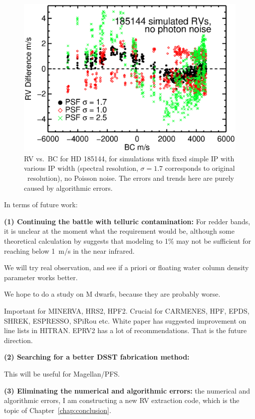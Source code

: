 \begin{figure}
\includegraphics[scale=0.65]{telluric/185144-rv-bc-rja01-rje01-rjf01.eps} 
\caption{RV vs.\ BC for HD 185144, for simulations with fixed simple
IP with various IP width (spectral resolution, $\sigma=1.7$
corresponds to original \keck\ resolution), no Poisson noise. The
errors and trends here are purely caused by algorithmic errors.
\label{telluric:fig:algorithm}}
\end{figure}

In terms of future work:

{\bf (1) Continuing the battle with telluric contamination: } For
redder bands, it is unclear at the moment what the requirement would
be, although some theoretical calculation by
\cite{2016AAS...22713719S} suggests that modeling to 1\% may not be
sufficient for reaching below 1~m/s in the near infrared.

We will try real observation, and see if a priori or floating water
column density parameter works better.

We hope to do a study on M dwarfs, because they are probably worse.

Important for MINERVA, HRS2, HPF2. Crucial for CARMENES, HPF, EPDS, SHREK,
ESPRESSO, SPiRou etc. White paper has suggested improvement on line
lists in HITRAN. EPRV2 has a lot of recommendations. That is the
future direction.

{\bf (2) Searching for a better DSST fabrication method: }

This will be useful for Magellan/PFS.

{\bf (3) Eliminating the numerical and algorithmic errors: } the
numerical and algorithmic errors, I am constructing a new RV
extraction code, which is the topic of Chapter~\ref{chap:conclusion}.



